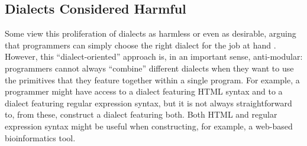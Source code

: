\subsection{Dialects Considered Harmful}
Some  view this proliferation of dialects as harmless or even as desirable, arguing that programmers can simply choose the right dialect for the job at hand \cite{journals/stp/Ward94}. However, this ``dialect-oriented'' approach is, in an important sense, anti-modular: programmers cannot always ``combine'' different dialects when they want to use the primitives that they feature together within a single program. For example, a programmer might have access to a dialect featuring HTML syntax and to a dialect featuring regular expression syntax, but it is not always straightforward to, from these, construct a dialect featuring both. Both HTML and regular expression syntax might be useful when constructing, for example, a web-based bioinformatics tool. 

